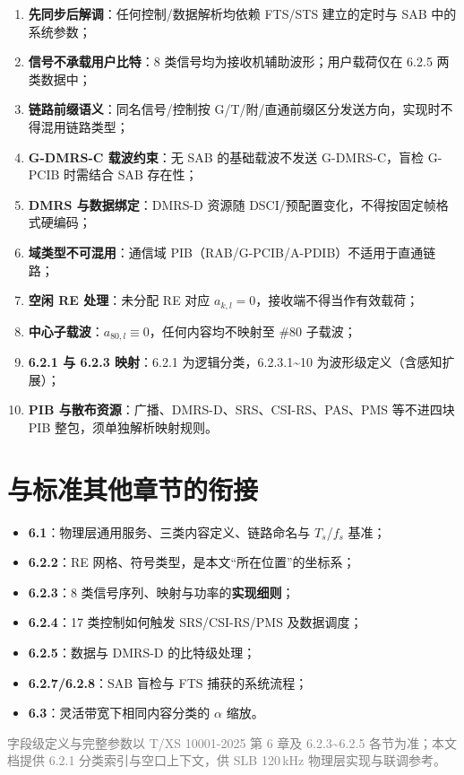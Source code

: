 \documentclass[11pt,a4paper]{ctexart}
\begin{document}
\begin{enumerate}[nosep]
  \item \textbf{先同步后解调}：任何控制/数据解析均依赖 FTS/STS 建立的定时与 SAB 中的系统参数；
  \item \textbf{信号不承载用户比特}：8 类信号均为接收机辅助波形；用户载荷仅在 6.2.5 两类数据中；
  \item \textbf{链路前缀语义}：同名信号/控制按 G/T/附/直通前缀区分发送方向，实现时不得混用链路类型；
  \item \textbf{G-DMRS-C 载波约束}：无 SAB 的基础载波不发送 G-DMRS-C，盲检 G-PCIB 时需结合 SAB 存在性；
  \item \textbf{DMRS 与数据绑定}：DMRS-D 资源随 DSCI/预配置变化，不得按固定帧格式硬编码；
  \item \textbf{域类型不可混用}：通信域 PIB（RAB/G-PCIB/A-PDIB）不适用于直通链路；
  \item \textbf{空闲 RE 处理}：未分配 RE 对应 $a_{k,l}{=}0$，接收端不得当作有效载荷；
  \item \textbf{中心子载波}：$a_{80,l}\equiv 0$，任何内容均不映射至 \#80 子载波；
  \item \textbf{6.2.1 与 6.2.3 映射}：6.2.1 为逻辑分类，6.2.3.1\textasciitilde 10 为波形级定义（含感知扩展）；
  \item \textbf{PIB 与散布资源}：广播、DMRS-D、SRS、CSI-RS、PAS、PMS 等不进四块 PIB 整包，须单独解析映射规则。
\end{enumerate}

\section{与标准其他章节的衔接}

\begin{itemize}[nosep]
  \item \textbf{6.1}：物理层通用服务、三类内容定义、链路命名与 $T_s$/$f_s$ 基准；
  \item \textbf{6.2.2}：RE 网格、符号类型，是本文``所在位置''的坐标系；
  \item \textbf{6.2.3}：8 类信号序列、映射与功率的\textbf{实现细则}；
  \item \textbf{6.2.4}：17 类控制如何触发 SRS/CSI-RS/PMS 及数据调度；
  \item \textbf{6.2.5}：数据与 DMRS-D 的比特级处理；
  \item \textbf{6.2.7/6.2.8}：SAB 盲检与 FTS 捕获的系统流程；
  \item \textbf{6.3}：灵活带宽下相同内容分类的 $\alpha$ 缩放。
\end{itemize}

\vfill
\begin{center}
\small\textcolor{gray}{字段级定义与完整参数以 T/XS 10001-2025 第 6 章及 6.2.3\textasciitilde 6.2.5 各节为准；本文档提供 6.2.1 分类索引与空口上下文，供 SLB 120\,kHz 物理层实现与联调参考。}
\end{center}
\end{document}
